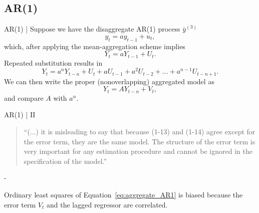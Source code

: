 \documentclass[aspectratio=169, xcolor=dvipsnames]{beamer} %
\begin{document}
\subsection{AR(1)}

\begin{frame}{AR(1) | \textcite{hickman_effects_1972}}
    Suppose we have the disaggregate AR(1) process  $\bar{y}^{(3)}$
    \begin{equation}
        y_{t} = a y_{t-1} + u_{t},
    \end{equation}
    which, after applying the mean-aggregation scheme implies 
    \begin{equation}
        Y_{t} = a Y_{t - 1} + U_{t}.
    \end{equation}
    Repeated substitution results in
    \begin{equation}
        Y_{t} = a^{n} Y_{t - n} + U_{t} + a U_{t - 1} + a^{2} U_{t - 2} + ... + a^{n - 1} U_{t - n + 1}.
    \end{equation}
    We can then write the proper (nonoverlapping) aggregated model as 
    \begin{equation} \label{eq:aggregate_AR1}
        Y_{t} = A Y_{t - n} + V_{t},
    \end{equation}
    and compare $A$ with $a^{n}$. 
\end{frame}


\begin{frame}{AR(1) | \textcite{hickman_effects_1972} II}
    \begin{quote}
        ``(...) it is misleading to say that because (1-13) and (1-14) agree except for the error term, they are the same model. The structure of the error term is very important for any estimation procedure and cannot be ignored in the specification of the model.''
    \end{quote}
    \begin{flushright} - \textcite{hickman_effects_1972} \end{flushright}
    \bigskip
    Ordinary least squares of Equation~\ref{eq:aggregate_AR1} is biased because the error term $V_{t}$ and the lagged regressor are correlated.     
\end{frame}

\end{document}
